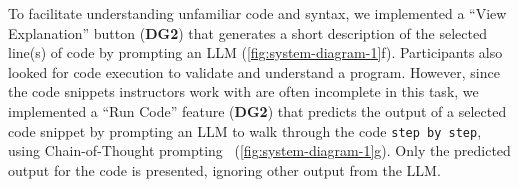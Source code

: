 To facilitate understanding unfamiliar code and syntax, we implemented a ``View Explanation'' button (\textbf{DG2}) that generates a short description of the selected line(s) of code by prompting an LLM (\cref{fig:system-diagram-1}f). 
Participants also looked for code execution to validate and understand a program. However, since the code snippets instructors work with are often incomplete in this task, we implemented a ``Run Code'' feature (\textbf{DG2}) that predicts the output of a selected code snippet by prompting an LLM to walk through the code \texttt{step by step}, using Chain-of-Thought prompting~\cite{wei2022chain} (\cref{fig:system-diagram-1}g). Only the predicted output for the code is presented, ignoring other output from the LLM.


